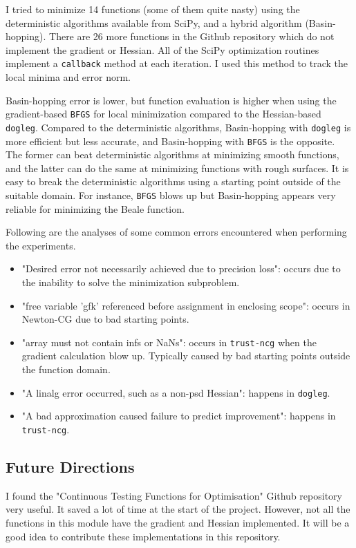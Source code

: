 \documentclass[conference]{IEEEtran}
\begin{document}
I tried to minimize 14 functions (some of them quite nasty) using the deterministic algorithms available from SciPy, and a hybrid algorithm (Basin-hopping). There are 26 more functions in the Github repository which do not implement the gradient or Hessian. All of the SciPy optimization routines implement a \texttt{callback} method at each iteration. I used this method to track the local minima and error norm.

Basin-hopping error is lower, but function evaluation is higher when using the gradient-based \texttt{BFGS} for local minimization compared to the Hessian-based \texttt{dogleg}. Compared to the deterministic algorithms,  Basin-hopping with \texttt{dogleg} is more efficient but less accurate, and Basin-hopping with \texttt{BFGS} is the opposite. The former can beat deterministic algorithms at minimizing smooth functions, and the latter can do the same at minimizing functions with rough surfaces. It is easy to break the deterministic algorithms using a starting point outside of the suitable domain. For instance, \texttt{BFGS} blows up but Basin-hopping appears very reliable for minimizing the Beale function.

Following are the analyses of some common errors encountered when performing the experiments.
\begin{itemize}
	\item "Desired error not necessarily achieved due to precision loss": occurs due to the inability to solve the minimization subproblem.
	\item "free variable 'gfk' referenced before assignment in enclosing scope": occurs in Newton-CG due to bad starting points.
	\item "array must not contain infs or NaNs": occurs in \texttt{trust-ncg} when the gradient calculation blow up. Typically caused by bad starting points outside the function domain.
	\item "A linalg error occurred, such as a non-psd Hessian": happens in \texttt{dogleg}.
	\item "A bad approximation caused failure to predict improvement": happens in \texttt{trust-ncg}.
\end{itemize}

\subsection{Future Directions}

I found the "Continuous Testing Functions for Optimisation" Github repository very useful. It saved a lot of time at the start of the project. However, not all the functions in this module have the gradient and Hessian implemented. It will be a good idea to contribute these implementations in this repository.
\end{document}
